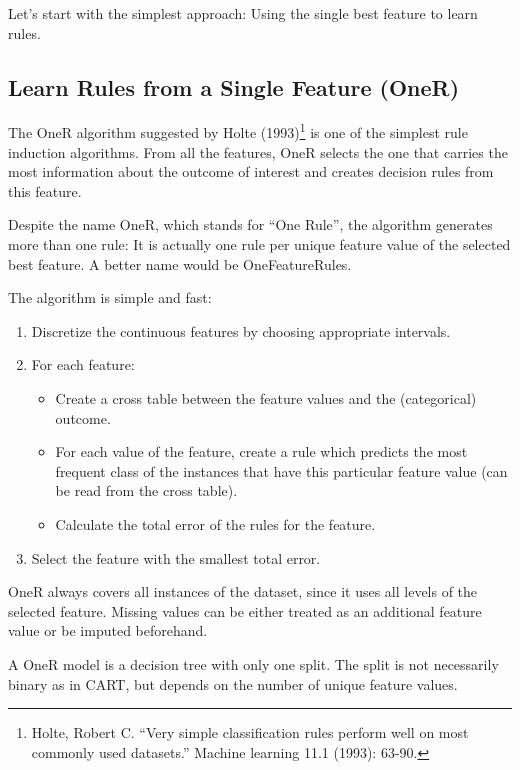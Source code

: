 \documentclass[12pt,]{krantz}
\providecommand{\tightlist}{%
  \setlength{\itemsep}{0pt}\setlength{\parskip}{0pt}}
\begin{document}
Let's start with the simplest approach: Using the single best feature to
learn rules.

\subsection{Learn Rules from a Single Feature
(OneR)}\label{learn-rules-from-a-single-feature-oner}

The OneR algorithm suggested by Holte (1993)\footnote{Holte, Robert C.
  ``Very simple classification rules perform well on most commonly used
  datasets.'' Machine learning 11.1 (1993): 63-90.} is one of the
simplest rule induction algorithms. From all the features, OneR selects
the one that carries the most information about the outcome of interest
and creates decision rules from this feature.

Despite the name OneR, which stands for ``One Rule'', the algorithm
generates more than one rule: It is actually one rule per unique feature
value of the selected best feature. A better name would be
OneFeatureRules.

The algorithm is simple and fast:

\begin{enumerate}
\def\labelenumi{\arabic{enumi}.}
\tightlist
\item
  Discretize the continuous features by choosing appropriate intervals.
\item
  For each feature:

  \begin{itemize}
  \tightlist
  \item
    Create a cross table between the feature values and the
    (categorical) outcome.
  \item
    For each value of the feature, create a rule which predicts the most
    frequent class of the instances that have this particular feature
    value (can be read from the cross table).
  \item
    Calculate the total error of the rules for the feature.
  \end{itemize}
\item
  Select the feature with the smallest total error.
\end{enumerate}

OneR always covers all instances of the dataset, since it uses all
levels of the selected feature. Missing values can be either treated as
an additional feature value or be imputed beforehand.

A OneR model is a decision tree with only one split. The split is not
necessarily binary as in CART, but depends on the number of unique
feature values.
\end{document}
